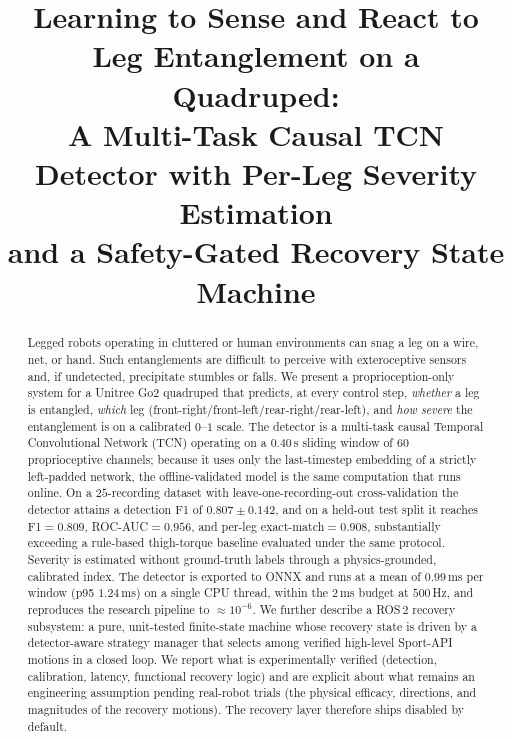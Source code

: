 \documentclass[conference]{IEEEtran}
\begin{document}
\title{Learning to Sense and React to Leg Entanglement on a Quadruped:\\
A Multi-Task Causal TCN Detector with Per-Leg Severity Estimation\\
and a Safety-Gated Recovery State Machine}

\author{
}

\maketitle

\begin{abstract}
Legged robots operating in cluttered or human environments can snag a leg on a
wire, net, or hand. Such entanglements are difficult to perceive with exteroceptive
sensors and, if undetected, precipitate stumbles or falls. We present a
proprioception-only system for a Unitree Go2 quadruped that predicts, at every
control step, \emph{whether} a leg is entangled, \emph{which} leg
(front-right/front-left/rear-right/rear-left), and \emph{how severe} the
entanglement is on a calibrated $0$--$1$ scale. The detector is a multi-task
causal Temporal Convolutional Network (TCN) operating on a $0.40$\,s sliding
window of $60$ proprioceptive channels; because it uses only the last-timestep
embedding of a strictly left-padded network, the offline-validated model is the
same computation that runs online. On a $25$-recording dataset with
leave-one-recording-out cross-validation the detector attains a detection
F1 of $0.807 \pm 0.142$, and on a held-out test split it reaches F1$=0.809$,
ROC-AUC$=0.956$, and per-leg exact-match$=0.908$, substantially exceeding a
rule-based thigh-torque baseline evaluated under the same protocol. Severity is
estimated without ground-truth labels through a physics-grounded, calibrated
index. The detector is exported to ONNX and runs at a mean of $0.99$\,ms per
window (p95 $1.24$\,ms) on a single CPU thread, within the $2$\,ms budget at
$500$\,Hz, and reproduces the research pipeline to $\approx\!10^{-6}$. We further
describe a ROS\,2 recovery subsystem: a pure, unit-tested finite-state machine
whose recovery state is driven by a detector-aware strategy manager that selects
among verified high-level Sport-API motions in a closed loop. We report what is
experimentally verified (detection, calibration, latency, functional recovery
logic) and are explicit about what remains an engineering assumption pending
real-robot trials (the physical efficacy, directions, and magnitudes of the
recovery motions). The recovery layer therefore ships disabled by default.
\end{abstract}
\end{document}
